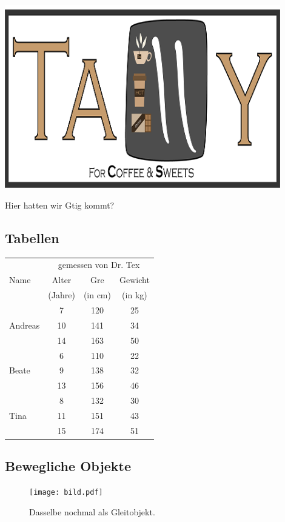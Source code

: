\documentclass[11pt,a4paper]{article} %
\begin{document}
\begin{center}
\includegraphics[width=12cm]{TallyLogo.png}
\end{center}

Hier hatten wir Gtig kommt?

\subsection{Tabellen}
\label{Tabellen}



\begin{center}
\begin{tabular}{|l||c|c|c|}
\hline
           & \multicolumn{3}{|c|}{gemessen von Dr. Tex} \\
\cline{2-4}
Name       &  Alter    & Gre   & Gewicht \\
           &  (Jahre)  & (in cm) & (in kg) \\
\hline
\hline
           &   7       &  120    &  25     \\
\cline{2-4}
Andreas    &   10      &  141    &  34     \\
\cline{2-4}
           &   14      &  163    &  50     \\
\hline
           &   6       &  110    &  22     \\
\cline{2-4}
Beate      &   9       &  138    &  32     \\
\cline{2-4}
           &   13      &  156    &  46     \\
\hline
           &   8       &  132    &  30     \\
\cline{2-4}
Tina       &   11      &  151    &  43     \\
\cline{2-4}
           &   15      &  174    &  51     \\
\hline
\end{tabular}
\end{center}

\subsection{Bewegliche Objekte}
\label{Floats}


\begin{figure}[h]
\begin{center}
\texttt{[image: bild.pdf]}
\caption{Dasselbe nochmal als Gleitobjekt. \label{bild}}
\end{center}
\end{figure}

\end{document}
